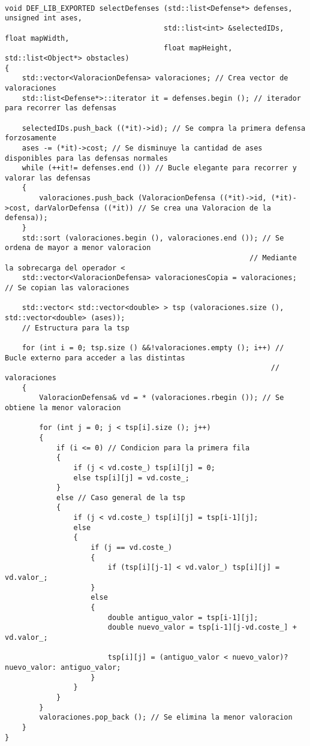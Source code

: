 \lstset{language=C++, texcl=true}
\begin{lstlisting}[frame=single]

void DEF_LIB_EXPORTED selectDefenses (std::list<Defense*> defenses, unsigned int ases,
                                     std::list<int> &selectedIDs, float mapWidth,
                                     float mapHeight, std::list<Object*> obstacles)
{
    std::vector<ValoracionDefensa> valoraciones; // Crea vector de valoraciones
    std::list<Defense*>::iterator it = defenses.begin (); // iterador para recorrer las defensas
    
    selectedIDs.push_back ((*it)->id); // Se compra la primera defensa forzosamente
    ases -= (*it)->cost; // Se disminuye la cantidad de ases disponibles para las defensas normales
    while (++it!= defenses.end ()) // Bucle elegante para recorrer y valorar las defensas
    {
        valoraciones.push_back (ValoracionDefensa ((*it)->id, (*it)->cost, darValorDefensa ((*it)) // Se crea una Valoracion de la defensa));
    }
    std::sort (valoraciones.begin (), valoraciones.end ()); // Se ordena de mayor a menor valoracion
                                                         // Mediante la sobrecarga del operador <
    std::vector<ValoracionDefensa> valoracionesCopia = valoraciones; // Se copian las valoraciones
    
    std::vector< std::vector<double> > tsp (valoraciones.size (), std::vector<double> (ases));
    // Estructura para la tsp
    
    for (int i = 0; tsp.size () &&!valoraciones.empty (); i++) // Bucle externo para acceder a las distintas
                                                              // valoraciones
    {
        ValoracionDefensa& vd = * (valoraciones.rbegin ()); // Se obtiene la menor valoracion
        
        for (int j = 0; j < tsp[i].size (); j++)
        {
            if (i <= 0) // Condicion para la primera fila
            {
                if (j < vd.coste_) tsp[i][j] = 0;
                else tsp[i][j] = vd.coste_;
            }
            else // Caso general de la tsp
            {
                if (j < vd.coste_) tsp[i][j] = tsp[i-1][j];
                else
                {
                    if (j == vd.coste_)
                    {
                        if (tsp[i][j-1] < vd.valor_) tsp[i][j] = vd.valor_;
                    }
                    else
                    {
                        double antiguo_valor = tsp[i-1][j];
                        double nuevo_valor = tsp[i-1][j-vd.coste_] + vd.valor_;
                        
                        tsp[i][j] = (antiguo_valor < nuevo_valor)? nuevo_valor: antiguo_valor;
                    }
                }
            }
        }
        valoraciones.pop_back (); // Se elimina la menor valoracion
    }
}
\end{lstlisting}

